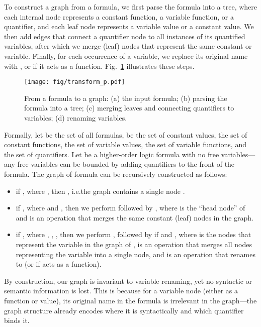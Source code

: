 \documentclass{article}
\begin{document}
To construct a graph from a formula, we first parse the formula into a tree, where each
internal node represents a constant function, a variable function, or a quantifier, and each leaf node represents a variable value 
or a constant value. We then add edges that connect a quantifier node to all instances of its quantified
variables, after which we merge (leaf) nodes that represent the same constant or
variable. Finally, for each occurrence of a variable, we replace its original 
name with , or  if it acts as a function. Fig.~\ref{fig:example} illustrates these
steps.

\begin{figure}[!htbp]
  \centering
  \texttt{[image: fig/transform\_p.pdf]}\\
  \caption{From a formula to a graph: (a)
    the input formula; (b) parsing the formula into a tree; (c) merging leaves and
    connecting quantifiers to variables; (d) renaming variables.}
    \label{fig:example}
    \vspace{-2mm}
\end{figure}

Formally, let  be the set of all formulas,  be the set of
constant values,  the set of constant functions,  the set of
variable values,  the set of variable functions, and  the set
of quantifiers. Let  be a higher-order logic formula with no free variables---any free
variables can be bounded by adding quantifiers  to the front of the formula. The graph  of formula  can be recursively
constructed as follows: 

\begin{itemize}
\item if , where , then , i.e.\@ the graph contains a single node . 
\item if , where  and , then we perform  followed by  ,  where  is the
``head node'' of  and   is an operation that merges the same
  constant (leaf) nodes in the graph. 
\item if , where , , , then we perform
, followed by  if  and
  , where  is the nodes that
  represent the variable  in the graph of ,   is an operation that
  merges all nodes representing the variable  into a single node, and
   is an operation that renames  to 
  (or  if  acts as a function). 
\end{itemize}

By construction, our graph is invariant to variable renaming, yet no
syntactic or semantic information is lost. This is because for a variable node (either as a function or value), its
original name in the formula is irrelevant in the graph---the graph structure already
encodes where it is syntactically and which quantifier binds it.
\end{document}
